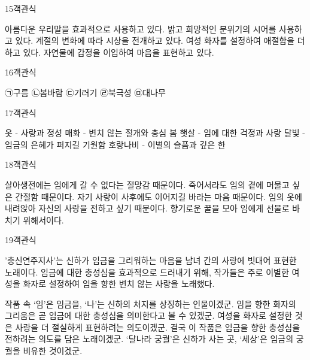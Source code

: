 \documentclass[fs9,seriesRus]{korfarm-base}
\begin{document}
\begin{kfQBlock}{15}{객관식}
\begin{kfChoices}
\kfChoice 아름다운 우리말을 효과적으로 사용하고 있다.
\kfChoice 밝고 희망적인 분위기의 시어를 사용하고 있다.
\kfChoice 계절의 변화에 따라 시상을 전개하고 있다.
\kfChoice 여성 화자를 설정하여 애절함을 더하고 있다.
\kfChoice 자연물에 감정을 이입하여 마음을 표현하고 있다.
\end{kfChoices}
\end{kfQBlock}
\begin{kfQBlock}{16}{객관식}
\begin{kfChoices}
\kfChoice ㉠구름
\kfChoice ㉡봄바람
\kfChoice ㉢기러기
\kfChoice ㉣북극성
\kfChoice ㉤대나무
\end{kfChoices}
\end{kfQBlock}
\begin{kfQBlock}{17}{객관식}
\begin{kfChoices}
\kfChoice 옷 - 사랑과 정성
\kfChoice 매화 - 변치 않는 절개와 충심
\kfChoice 봄 햇살 - 임에 대한 걱정과 사랑
\kfChoice 달빛 - 임금의 은혜가 퍼지길 기원함
\kfChoice 호랑나비 - 이별의 슬픔과 깊은 한
\end{kfChoices}
\end{kfQBlock}
\begin{kfQBlock}{18}{객관식}
\begin{kfChoices}
\kfChoice 살아생전에는 임에게 갈 수 없다는 절망감 때문이다.
\kfChoice 죽어서라도 임의 곁에 머물고 싶은 간절함 때문이다.
\kfChoice 자기 사랑이 사후에도 이어지길 바라는 마음 때문이다.
\kfChoice 임의 옷에 내려앉아 자신의 사랑을 전하고 싶기 때문이다.
\kfChoice 향기로운 꿀을 모아 임에게 선물로 바치기 위해서이다.
\end{kfChoices}
\end{kfQBlock}
\begin{kfQBlock}{19}{객관식}
\begin{kfEvidence}'충신연주지사'는 신하가 임금을 그리워하는 마음을 남녀 간의 사랑에 빗대어 표현한 노래이다. 임금에 대한 충성심을 효과적으로 드러내기 위해, 작가들은 주로 이별한 여성을 화자로 설정하여 임을 향한 변치 않는 사랑을 노래했다.\end{kfEvidence}
\begin{kfChoices}
\kfChoice 작품 속 ‘임’은 임금을, ‘나’는 신하의 처지를 상징하는 인물이겠군.
\kfChoice 임을 향한 화자의 그리움은 곧 임금에 대한 충성심을 의미한다고 볼 수 있겠군.
\kfChoice 여성을 화자로 설정한 것은 사랑을 더 절실하게 표현하려는 의도이겠군.
\kfChoice 결국 이 작품은 임금을 향한 충성심을 전하려는 의도를 담은 노래이겠군.
\kfChoice ‘달나라 궁궐’은 신하가 사는 곳, ‘세상’은 임금의 궁궐을 비유한 것이겠군.
\end{kfChoices}
\end{kfQBlock}
\end{document}
